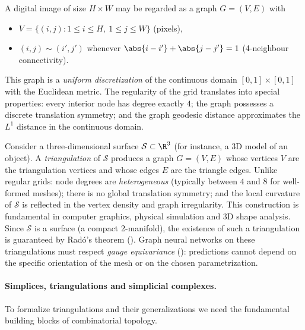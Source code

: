 \begin{example}
\label{ex:graphs:image-grid}
A digital image of size $H \times W$ may be regarded as a graph $G = (V, E)$ with
\begin{itemize}
  \item $V = \{(i,j) : 1 \le i \le H, \ 1 \le j \le W\}$ (pixels),
  \item $(i,j) \sim (i',j')$ whenever $\abs{i-i'} + \abs{j-j'} = 1$
        (4-neighbour connectivity).
\end{itemize}
This graph is a \emph{uniform discretization} of the continuous domain
$[0,1]\times[0,1]$ with the Euclidean metric. The regularity of the grid
translates into special properties: every interior node has degree exactly $4$;
the graph possesses a discrete translation symmetry; and the graph geodesic
distance approximates the $L^1$ distance in the continuous domain.
\end{example}

\begin{example}
\label{ex:graphs:triangulated}
Consider a three-dimensional surface $\mathcal{S} \subset \R^3$ (for instance, a
3D model of an object). A \emph{triangulation} of $\mathcal{S}$ produces a graph
$G = (V, E)$ whose vertices $V$ are the triangulation vertices and whose edges
$E$ are the triangle edges. Unlike regular grids: node degrees are
\emph{heterogeneous} (typically between $4$ and $8$ for well-formed meshes);
there is no global translation symmetry; and the local curvature of $\mathcal{S}$
is reflected in the vertex density and graph irregularity. This construction is
fundamental in computer graphics, physical simulation and 3D shape analysis.
Since $\mathcal{S}$ is a surface (a compact 2-manifold), the existence of such a
triangulation is guaranteed by Radó's theorem (). Graph
neural networks on these triangulations must respect \emph{gauge equivariance}
(): predictions cannot depend on the specific orientation of the
mesh or on the chosen parametrization.
\end{example}

\paragraph{Simplices, triangulations and simplicial complexes.}
To formalize triangulations and their generalizations we need the fundamental
building blocks of combinatorial topology.

